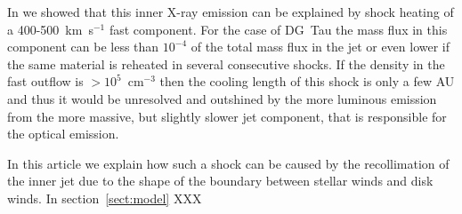 In \citet{2009A&A...493..579G} we showed that this inner X-ray emission can be explained by shock heating of a 400-500~km~s$^{-1}$ fast component. For the case of DG~Tau the mass flux in this component can be less than $10^{-4}$ of the total mass flux in the jet or even lower if the same material is reheated in several consecutive shocks. If the density in the fast outflow is $>10^5$~cm$^{-3}$ then the cooling length of this shock is only a few AU and thus it would be unresolved and outshined by the more luminous emission from the more massive, but slightly slower jet component, that is responsible for the optical emission.

In this article we explain how such a shock can be caused by the recollimation of the inner jet due to the shape of the boundary between stellar winds and disk winds. In section~\ref{sect:model} XXX